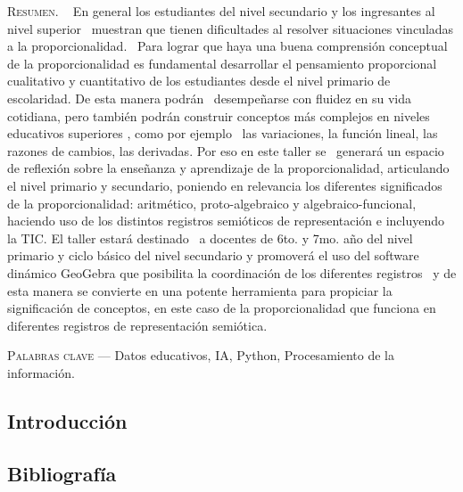 \begin{center}
	\begin{minipage}{0.75\linewidth} \small
		\textsc{Resumen}. ~
		En general los estudiantes del nivel secundario y los ingresantes al nivel superior  muestran que tienen dificultades al resolver situaciones vinculadas a la proporcionalidad.  Para lograr que haya una buena comprensión conceptual de la proporcionalidad es fundamental desarrollar el pensamiento proporcional cualitativo y cuantitativo de los estudiantes desde el nivel primario de escolaridad. De esta manera podrán  desempeñarse con fluidez en su vida cotidiana, pero también podrán construir conceptos más complejos en niveles educativos superiores , como por ejemplo  las variaciones, la función lineal, las razones de cambios, las derivadas. Por eso en este taller se  generará un espacio de reflexión sobre la enseñanza y aprendizaje de la proporcionalidad, articulando el nivel primario y secundario, poniendo en relevancia los diferentes significados de la proporcionalidad: aritmético, proto-algebraico y algebraico-funcional, haciendo uso de los distintos registros semióticos de representación e incluyendo la TIC. El taller estará destinado  a docentes de 6to. y 7mo. año del nivel primario y ciclo básico del nivel secundario y promoverá el uso del software dinámico GeoGebra que posibilita la coordinación de los diferentes registros  y de esta manera se convierte en una potente herramienta para propiciar la significación de conceptos, en este caso de la proporcionalidad que funciona en diferentes registros de representación semiótica.
	\end{minipage}
	
	\vspace{0.5em}
	
	\begin{minipage}{0.75\linewidth} \small
		\textsc{Palabras clave} --- Datos educativos, IA, Python, Procesamiento de la información.
	\end{minipage}
\end{center}

\subsection{Introducción}



\subsection{Bibliografía}

\nocite{*}
\printbibliography[keyword={02}]